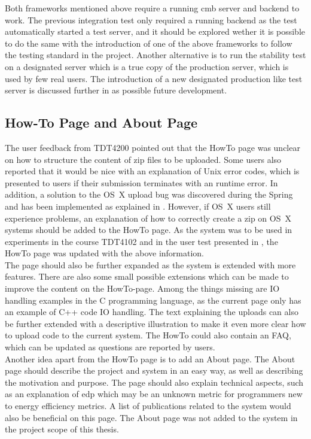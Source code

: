 Both frameworks mentioned above require a running \gls{cmb} server and backend to work. The previous integration test only required a running backend as the test automatically started a test server, and it should be explored wether it is possible to do the same with the introduction of one of the above frameworks to follow the testing standard in the project. Another alternative is to run the stability test on a designated server which is a true copy of the production server, which is used by few real users. The introduction of a new designated production like test server is discussed further in  as possible future development.

\subsection{How-To Page and About Page}
\label{sub-sec:prop-howto}
The user feedback from TDT4200 \cite{TDT4200} pointed out that the HowTo page was unclear on how to structure the content of zip files to be uploaded. Some users also reported that it would be nice with an explanation of Unix error codes, which is presented to users if their submission terminates with an runtime error. In addition, a solution to the OS~X upload bug was discovered during the Spring and has been implemented as explained in . However, if OS~X users still experience problems, an explanation of how to correctly create a zip on OS~X systems should be added to the HowTo page. As the system was to be used in experiments in the course TDT4102 \cite{TDT4102} and in the user test presented in , the HowTo page was updated with the above information. \\

The page should also be further expanded as the system is extended with more features. There are also some small possible extensions which can be made to improve the content on the HowTo-page. Among the things missing are IO handling examples in the C programming language, as the current page only has an example of C++ code IO handling. The text explaining the uploads can also be further extended with a descriptive illustration to make it even more clear how to upload code to the current system. The HowTo could also contain an FAQ, which can be updated as questions are reported by users. \\

Another idea apart from the HowTo page is to add an About page. The About page should describe the project and system in an easy way, as well as describing the motivation and purpose. The page should also explain technical aspects, such as an explanation of \gls{edp} which may be an unknown metric for programmers new to energy efficiency metrics. A list of publications related to the system would also be beneficial on this page. The About page was not added to the system in the project scope of this thesis.

